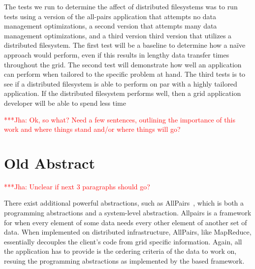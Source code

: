 \documentclass[a4paper,11pt]{article} \usepackage[utf8]{inputenc}
\newcommand{\jhanote}[1]{ {\textcolor{red} { ***Jha: #1 }}}
\newcommand{\yyenote}[1]{ {\textcolor{blue} { ***yye00: #1 }}} \else
\newcommand{\jhanote}[1]{} \newcommand{\yyenote}[1]{}
\begin{document}
The tests we run to determine the affect of distributed filesystems was
to run tests using a version of the all-pairs application that attempts
no data management optimizations, a second version that attempts many
data management optimizations, and a third version third version that
utilizes a distributed filesystem.  The first test will be a baseline to
determine how a naïve approach would perform, even if this results in
lengthy data transfer times throughout the grid.  The second test will
demonstrate how well an application can perform when tailored to the
specific problem at hand.  The third tests is to see if a distributed
filesystem is able to perform on par with a highly tailored application.
If the distributed filesystem performs well, then a grid application
developer will be able to spend less time 

\jhanote{Ok, so what? Need a few sentences, outlining the importance of
this work and where things stand and/or where things will go?}

\section{Old Abstract}


\jhanote{Unclear if next 3 paragraphs should go?}

There exist additional powerful abstractions, such as
AllPairs~\cite{allpairs}, which is both a programming abstractions and a
system-level abstraction.  Allpairs is a framework for when every
element of some data needs every other element of another set of data.
When implemented on distributed infrastructure, AllPairs, like
MapReduce, essentially decouples the client's code from grid specific
information.  Again, all the application has to provide is the ordering
criteria of the data to work on, resuing the programming abstractions as
implemented by the based framework.
\end{document}
